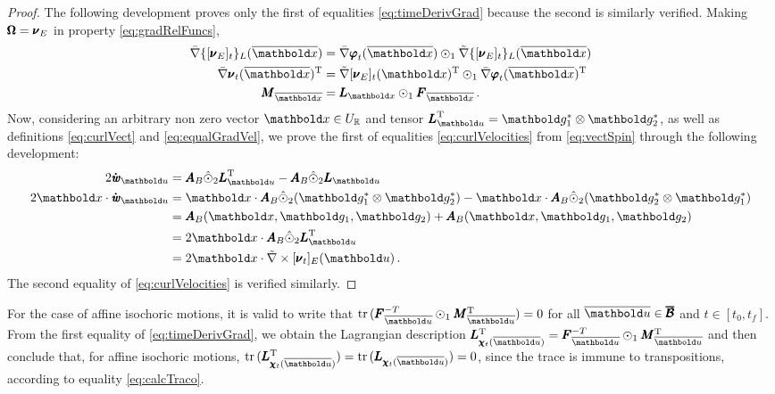 {\footnotesize
\begin{proof}
The following development proves only the first of equalities \eqref{eq:timeDerivGrad} because the second is similarly verified. Making $\pmb{\Omega}=\pmb{\nu}_E$ in property \eqref{eq:gradRelFuncs}, 
\begin{align*}
\bar{\nabla}\{[{\tnr{\nu}_E}]_{t}\}_L(\overline{\vto{x}})&=\bar{\nabla}{\tnr{\varphi}}_{t}(\overline{\vto{x}})\odot_1\tilde{\nabla}\{[{\tnr{\nu}_E}]_{t}\}_L(\overline{\vto{x}})\\
\bar{\nabla}{\tnr{\nu}}_{t}(\overline{\vto{x}})^\text{T}&=\tilde{\nabla}[\tnr{\nu}_E]_{t}({\vto{x}})^\text{T}\odot_1\bar{\nabla}{\tnr{\varphi}}_{t}(\overline{\vto{x}})^\text{T}\\
\tnr{M}_{\overline{\vto{x}}}&=\tnr{L}_{{\vto{x}}}\odot_1\tnr{F}_{\overline{\vto{x}}}\,.
\end{align*}
Now, considering an arbitrary non zero vector $\vto{x}\in U_\real$ and tensor ${\tnr{L}}_{{\vto{u}}}^{\text{T}}=\vto{g}_1^*\otimes\vto{g}_2^*$, as well as definitions \eqref{eq:curlVect} and \eqref{eq:equalGradVel}, we prove the first of equalities \eqref{eq:curlVelocities} from \eqref{eq:vectSpin} through the following development:
\begin{align*}
2\tnr{\dot{\mathit{w}}}_{{\vto{u}}} &=\tnr{A}_B\hat{\odot}_2{\tnr{L}}_{{\vto{u}}}^{\text{T}}-\tnr{A}_B\hat{\odot}_2{\tnr{L}}_{{\vto{u}}}\\
2\vto{x}\cdot\tnr{\dot{\mathit{w}}}_{{\vto{u}}}&=\vto{x}\cdot\tnr{A}_B\hat{\odot}_2(\vto{g}_1^*\otimes\vto{g}_2^*) - \vto{x}\cdot\tnr{A}_B\hat{\odot}_2(\vto{g}_2^*\otimes\vto{g}_1^*)\\
&=\tnr{A}_B(\vto{x},\vto{g}_1,\vto{g}_2) + \tnr{A}_B(\vto{x},\vto{g}_1,\vto{g}_2)\\
&=2\vto{x}\cdot\tnr{A}_B\hat{\odot}_2{\tnr{L}}_{{\vto{u}}}^{\text{T}}\\
&=2\vto{x}\cdot\tilde{\nabla}\times\fua{[\tnr{\nu}_t]_E}{{\vto{u}}}\,.
\end{align*}
The second equality of \eqref{eq:curlVelocities} is verified similarly.
\end{proof}
}

For the case of affine isochoric motions, it is valid to write that $\trc{\tnr{F}_{\overline{\vto{u}}}^{-T}\odot_1\tnr{M}_{\overline{\vto{u}}}^{\text{T}}}=0$ for all $\overline{\vto{u}} \in \tnr{\overline{\mathcal{B}}}$ and $t\in[t_0,t_f]$. From the first equality of \eqref{eq:timeDerivGrad}, we obtain the Lagrangian description $\tnr{L}_{\tnr{\chi}_t(\overline{\vto{u}})}^{\text{T}}=\tnr{F}_{\overline{\vto{u}}}^{-T}\odot_1\tnr{M}_{\overline{\vto{u}}}^{\text{T}}$ and then conclude that, for affine isochoric motions, $\trc{\tnr{L}_{\tnr{\chi}_t(\overline{\vto{u}})}^{\text{T}}}=\trc{\tnr{L}_{\tnr{\chi}_t(\overline{\vto{u}})}}=0$, since the trace is immune to transpositions, according to equality \eqref{eq:calcTraco}.
